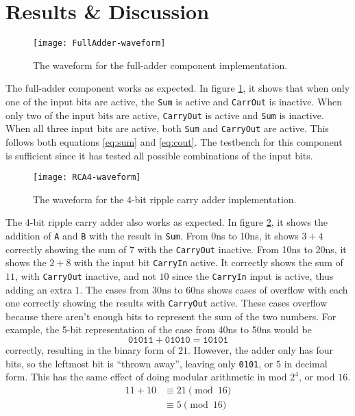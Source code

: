 \documentclass[11pt]{report}
\begin{document}
\newpage

\section*{Results \& Discussion}
\begin{figure}[h!]
    \centering
    \texttt{[image: FullAdder-waveform]}
    \caption{
        The waveform for the full-adder component implementation.
    }
    \label{fig:FullAdder-waveform}
\end{figure}

The full-adder component works as expected. In figure \ref{fig:FullAdder-waveform}, it shows that
when only one of the input bits are active, the \verb|Sum| is active and \verb|CarrOut| is inactive.
When only two of the input bits are active, \verb|CarryOut| is active and \verb|Sum| is inactive.
When all three input bits are active, both \verb|Sum| and \verb|CarryOut| are active. This follows
both equations \eqref{eq:sum} and \eqref{eq:cout}. The testbench for this component is sufficient
since it has tested all possible combinations of the input bits.

\begin{figure}[h!]
    \centering
    \texttt{[image: RCA4-waveform]}
    \caption{
        The waveform for the 4-bit ripple carry adder implementation.
    }
    \label{fig:RCA4-waveform}
\end{figure}

The 4-bit ripple carry adder also works as expected. In figure \ref{fig:RCA4-waveform}, it shows
the addition of \verb|A| and \verb|B| with the result in \verb|Sum|. From 0ns to 10ns, it shows $3 +
4$ correctly showing the sum of $7$ with the \verb|CarryOut| inactive. From 10ns to 20ns, it shows
the $2 + 8$ with the input bit \verb|CarryIn| active. It correctly shows the sum of $11$, with
\verb|CarryOut| inactive, and not $10$ since the \verb|CarryIn| input is active, thus adding an
extra $1$. The cases from 30ns to 60ns shows cases of overflow with each one correctly showing the
results with \verb|CarryOut| active. These cases overflow because there aren't enough bits to
represent the sum of the two numbers. For example, the 5-bit representation of the case from 40ns to
50ns would be
\[
    \texttt{01011} + \texttt{01010} = \texttt{10101}
\]
correctly, resulting in the binary form of $21$. However, the adder only has four bits, so the
leftmost bit is ``thrown away'', leaving only \verb|0101|, or $5$ in decimal form. This has the same
effect of doing modular arithmetic in mod $2^4$, or mod $16$.
\begin{align*}
    11 + 10 &\equiv 21 \pmod{16} \\
            &\equiv 5  \pmod{16}
\end{align*}
\end{document}
